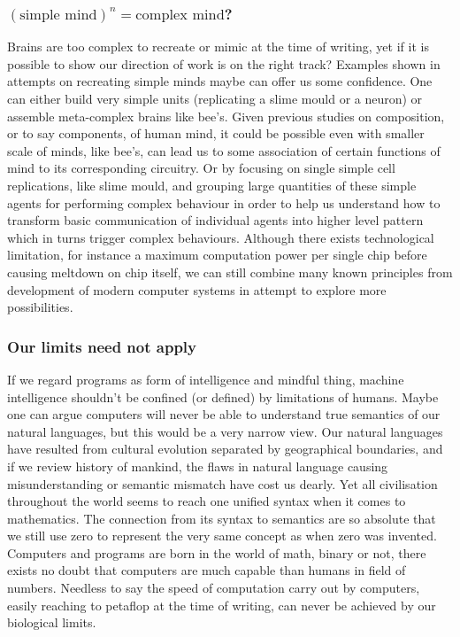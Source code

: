 \documentclass[11pt]{article}
\begin{document}
\subsubsection*{$(\mbox{simple mind})^n = \mbox{complex mind}$?}
Brains are too complex to recreate or mimic at the time of writing, yet if it is possible to show our direction of work is on the right track? Examples shown in attempts on recreating simple minds maybe can offer us some confidence. One can either build very simple units (replicating a slime mould or a neuron) or assemble meta-complex brains like bee's. Given previous studies on composition, or to say components, of human mind, it could be possible even with smaller scale of minds, like bee's, can lead us to some association of certain functions of mind to its corresponding circuitry. Or by focusing on single simple cell replications, like slime mould, and grouping large quantities of these simple agents for performing complex behaviour in order to help us understand how to transform basic communication of individual agents into higher level pattern which in turns trigger complex behaviours. Although there exists technological limitation, for instance a maximum computation power per single chip before causing meltdown on chip itself, we can still combine many known principles from development of modern computer systems in attempt to explore more possibilities. 

\subsubsection*{Our limits need not apply}
If we regard programs  as form of intelligence and mindful thing, machine intelligence shouldn't be confined (or defined) by limitations of humans. Maybe one can argue computers will never be able to understand true semantics of our natural languages, but this would be a very narrow view. Our natural languages have resulted from cultural evolution separated by geographical boundaries, and if we review history of mankind, the flaws in natural language causing misunderstanding or semantic mismatch have cost us dearly. Yet all civilisation throughout the world seems to reach one unified syntax when it comes to mathematics. The connection from its syntax to semantics are so absolute that we still use zero to represent the very same concept as when zero was invented. Computers and programs are born in the world of math, binary or not, there exists no doubt that computers are much capable than humans in field of numbers. Needless to say the speed of computation carry out by computers, easily reaching to petaflop at the time of writing, can never be achieved by our biological limits.
\end{document}
